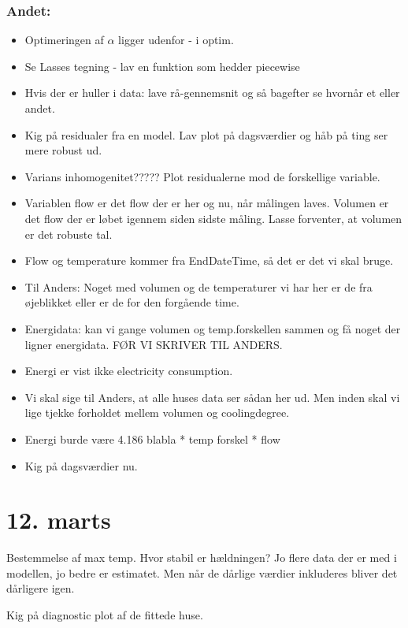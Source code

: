 \subsubsection{Andet:}
\begin{itemize}
    \item Optimeringen af $\alpha$ ligger udenfor - i optim.
    \item Se Lasses tegning - lav en funktion som hedder piecewise
    \item Hvis der er huller i data: lave rå-gennemsnit og så bagefter se hvornår et eller andet.
    \item Kig på residualer fra en model. Lav plot på dagsværdier og håb på ting ser mere robust ud. 
    \item Varians inhomogenitet????? Plot residualerne mod de forskellige variable. 
    \item Variablen flow er det flow der er her og nu, når målingen laves. Volumen er det flow der er løbet igennem siden sidste måling. Lasse forventer, at volumen er det robuste tal. 
    \item Flow og temperature kommer fra EndDateTime, så det er det vi skal bruge. 
    \item Til Anders: Noget med volumen og de temperaturer vi har her er de fra øjeblikket eller er de for den forgående time. 
    \item Energidata: kan vi gange volumen og temp.forskellen sammen og få noget der ligner energidata. FØR VI SKRIVER TIL ANDERS. 
    \item Energi er vist ikke electricity consumption. 
    \item Vi skal sige til Anders, at alle huses data ser sådan her ud. Men inden skal vi lige tjekke forholdet mellem volumen og coolingdegree. 
    \item Energi burde være 4.186 blabla * temp forskel * flow
    \item Kig på dagsværdier nu. 
\end{itemize}

\pagebreak

\section{12. marts}

Bestemmelse af max temp. Hvor stabil er hældningen? Jo flere data der er med i modellen, jo bedre er estimatet. Men når de dårlige
værdier inkluderes bliver det dårligere igen.

Kig på diagnostic plot af de fittede huse. 

